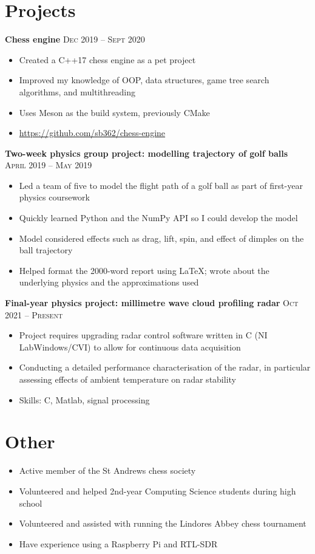 \documentclass{article}
\begin{document}
	\section*{Projects}
		\textbf{Chess engine} \hfill \textsc{Dec 2019 -- Sept 2020}
		\begin{itemize}
			\item Created a C++17 chess engine as a pet project
			\item Improved my knowledge of OOP, data structures, game tree search algorithms, and multithreading
			\item Uses Meson as the build system, previously CMake
			\item \url{https://github.com/sb362/chess-engine}
		\end{itemize}
		\bigskip
		\textbf{Two-week physics group project: modelling trajectory of golf balls} \hfill \textsc{April 2019 -- May 2019}
		\begin{itemize}
			\item Led a team of five to model the flight path of a golf ball as part of first-year physics coursework
			\item Quickly learned Python and the NumPy API so I could develop the model
			\item Model considered effects such as drag, lift, spin, and effect of dimples on the ball trajectory
			\item Helped format the 2000-word report using \LaTeX ; wrote about the underlying physics and the approximations used
		\end{itemize}
		\bigskip
		\textbf{Final-year physics project: millimetre wave cloud profiling radar} \hfill \textsc{Oct 2021 -- Present}
		\begin{itemize}
			\item Project requires upgrading radar control software written in C (NI LabWindows/CVI) to allow for continuous data acquisition
			\item Conducting a detailed performance characterisation of the radar, in particular assessing effects of ambient temperature on radar stability
			\item Skills: C, Matlab, signal processing
		\end{itemize}
	
	\section*{Other}
		\begin{itemize}
			\item Active member of the St Andrews chess society
			\item Volunteered and helped 2nd-year Computing Science students during high school
			\item Volunteered and assisted with running the Lindores Abbey chess tournament
			\item Have experience using a Raspberry Pi and RTL-SDR
		\end{itemize}
	
\end{document}
